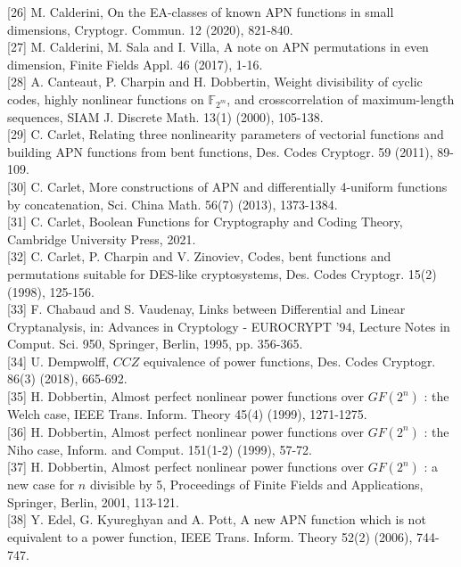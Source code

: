 \documentclass[10pt]{article}
\begin{document}
[26] M. Calderini, On the EA-classes of known APN functions in small dimensions, Cryptogr. Commun. 12 (2020), 821-840.\\[0pt]
[27] M. Calderini, M. Sala and I. Villa, A note on APN permutations in even dimension, Finite Fields Appl. 46 (2017), 1-16.\\[0pt]
[28] A. Canteaut, P. Charpin and H. Dobbertin, Weight divisibility of cyclic codes, highly nonlinear functions on $\mathbb{F}_{2^{m}}$, and crosscorrelation of maximum-length sequences, SIAM J. Discrete Math. 13(1) (2000), 105-138.\\[0pt]
[29] C. Carlet, Relating three nonlinearity parameters of vectorial functions and building APN functions from bent functions, Des. Codes Cryptogr. 59 (2011), 89-109.\\[0pt]
[30] C. Carlet, More constructions of APN and differentially 4-uniform functions by concatenation, Sci. China Math. 56(7) (2013), 1373-1384.\\[0pt]
[31] C. Carlet, Boolean Functions for Cryptography and Coding Theory, Cambridge University Press, 2021.\\[0pt]
[32] C. Carlet, P. Charpin and V. Zinoviev, Codes, bent functions and permutations suitable for DES-like cryptosystems, Des. Codes Cryptogr. 15(2) (1998), 125-156.\\[0pt]
[33] F. Chabaud and S. Vaudenay, Links between Differential and Linear Cryptanalysis, in: Advances in Cryptology - EUROCRYPT '94, Lecture Notes in Comput. Sci. 950, Springer, Berlin, 1995, pp. 356-365.\\[0pt]
[34] U. Dempwolff, $C C Z$ equivalence of power functions, Des. Codes Cryptogr. 86(3) (2018), 665-692.\\[0pt]
[35] H. Dobbertin, Almost perfect nonlinear power functions over $G F\left(2^{n}\right)$ : the Welch case, IEEE Trans. Inform. Theory 45(4) (1999), 1271-1275.\\[0pt]
[36] H. Dobbertin, Almost perfect nonlinear power functions over $G F\left(2^{n}\right)$ : the Niho case, Inform. and Comput. 151(1-2) (1999), 57-72.\\[0pt]
[37] H. Dobbertin, Almost perfect nonlinear power functions over $G F\left(2^{n}\right)$ : a new case for $n$ divisible by 5, Proceedings of Finite Fields and Applications, Springer, Berlin, 2001, 113-121.\\[0pt]
[38] Y. Edel, G. Kyureghyan and A. Pott, A new APN function which is not equivalent to a power function, IEEE Trans. Inform. Theory 52(2) (2006), 744-747.\\[0pt]
\end{document}
